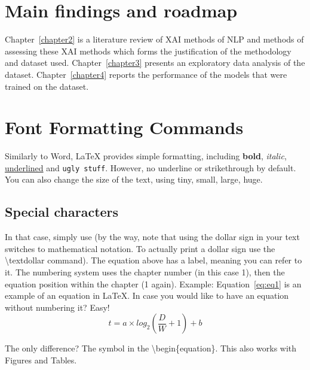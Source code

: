 \section{Main findings and roadmap}
Chapter~\ref{chapter2} is a literature review of XAI methods of NLP and methods of assessing these XAI methods which forms the justification of the methodology and dataset used. Chapter~\ref{chapter3} presents an exploratory data analysis of the dataset. Chapter~\ref{chapter4} reports the performance of the models that were trained on the dataset. 

\section{Font Formatting Commands}
Similarly to Word, LaTeX provides simple formatting, including \textbf{bold}, \textit{italic}, \underline{underlined} and \texttt{ugly stuff}.
However, no underline or strikethrough by default.
You can also change the size of the text, using {\tiny tiny}, {\small small}, {\large large}, {\huge huge}.

\subsection{Special characters}
In that case, simply use \textdollar{} (by the way, note that using the dollar sign in your text switches to mathematical notation. To actually print a dollar sign use the \textbackslash{}textdollar command).
The equation above has a label, meaning you can refer to it. The numbering system uses the chapter number (in this case 1), then the equation position within the chapter (1 again).
Example: Equation~\ref{eq:eq1} is an example of an equation in LaTeX{}.
In case you would like to have an equation without numbering it? Easy!
\begin{equation*}
t = a \times log_{2}(\frac{D}{W} + 1) + b
\end{equation*}

The only difference? The \textasteriskcentered{}  symbol in the \textbackslash{}begin\{equation\textbf{\textasteriskcentered}\}.
This also works with Figures and Tables.
